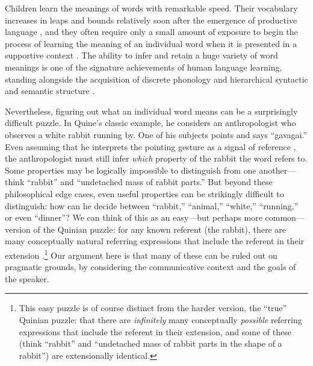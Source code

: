 \documentclass[review]{elsarticle}
\begin{document}
Children learn the meanings of words with remarkable speed. Their vocabulary increases in leaps and bounds relatively soon after the emergence of productive language \citep{fenson1994}, and they often require only a small amount of exposure to begin the process of learning the meaning of an individual word when it is presented in a supportive context \citep{carey1978,markson1997}. The ability to infer and retain a huge variety of word meanings is one of the signature achievements of human language learning, standing alongside the acquisition of discrete phonology and hierarchical syntactic and semantic structure \citep{pinker2005}.

Nevertheless, figuring out what an individual word means can be a surprisingly difficult puzzle. In Quine's \citeyear{quine1960} classic example, he considers an anthropologist who observes a white rabbit running by. One of his subjects points and says ``gavagai.'' Even assuming that he interprets the pointing gesture as a signal of reference \citep{wittgenstein1953,tomasello2008}, the anthropologist must still infer \emph{which} property of the rabbit the word refers to.  Some properties may be logically impossible to distinguish from one another---think ``rabbit'' and ``undetached mass of rabbit parts.'' But beyond these philosophical edge cases, even useful properties can be strikingly difficult to distinguish: how can he decide between ``rabbit,'' ``animal,'' ``white,'' ``running,'' or even ``dinner''? We can think of this as an easy---but perhaps more common---version of the Quinian puzzle: for any known referent (the rabbit), there are many conceptually natural referring expressions that include the referent in their extension \citep{gleitman1992}.\footnote{This easy puzzle is of course distinct from the harder version, the ``true'' Quinian puzzle: that there are \emph{infinitely} many conceptually \emph{possible} referring expressions that include the referent in their extension, and some of these (think ``rabbit'' and ``undetached mass of rabbit parts in the shape of a rabbit'') are extensionally identical.} Our argument here is that many of these can be ruled out on pragmatic grounds, by considering the communicative context and the goals of the speaker. 
\end{document}
